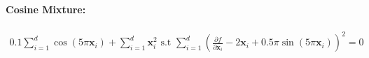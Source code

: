 \paragraph{Cosine Mixture:}
\begin{align*}
    0.1 \sum_{i=1}^d \cos(5\pi\mathbf{x}_i) + \sum_{i=1}^d \mathbf{x}_i^2 \text{ s.t } \sum_{i=1}^d \left(\frac{\partial f}{\partial \mathbf{x}_i} - 2\mathbf{x}_i + 0.5\pi\sin(5\pi\mathbf{x}_i) \right)^2 = 0
\end{align*}


